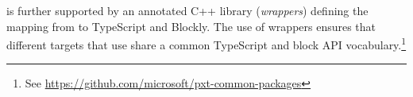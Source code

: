
 \MC is further supported by an annotated C++ library (\emph{\MC wrappers}) defining the mapping from \CO to TypeScript and Blockly. The use of \MC wrappers ensures that different \MC targets that use \CO share a common TypeScript and block API vocabulary.\footnote{See \url{https://github.com/microsoft/pxt-common-packages}}




